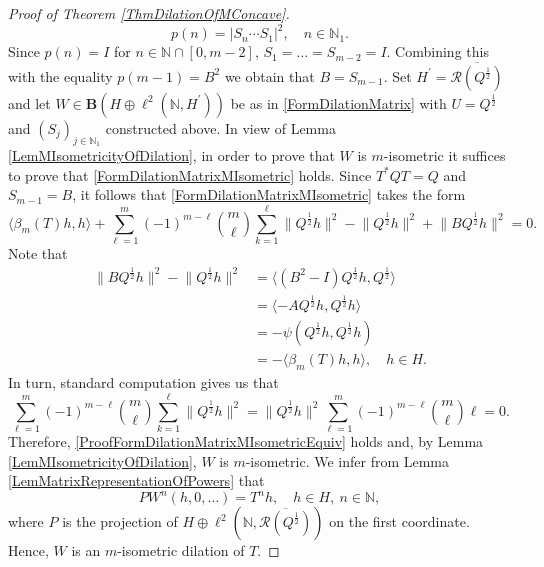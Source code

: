 \documentclass{amsart}
\theoremstyle{definition}
\numberwithin{equation}{section}
\begin{document}
\begin{proof}[Proof of Theorem \ref{ThmDilationOfMConcave}]
    \begin{equation}
        \label{ProofFormWeightOfUWSPolynomial}
        p(n) = \lvert S_{n}\cdots S_{1}\rvert^{2},\quad n\in \mathbb{N}_{1}.
    \end{equation}
    Since $ p(n)= I $ for $ n\in \mathbb{N}\cap[0,m-2] $, $ S_{1}= \ldots = S_{m-2} = I $. Combining this with the equality $ p(m-1) = B^{2} $ we obtain that $ B = S_{m-1} $. Set $ H^{\prime} = \overline{\mathcal{R}(Q^{\frac{1}{2}})} $ and let $ W\in \mathbf{B}(H\oplus \ell^{2}(\mathbb{N},H^{\prime})) $ be as in \eqref{FormDilationMatrix} with $ U = Q^{\frac{1}{2}} $ and $ (S_{j})_{j\in \mathbb{N}_{1}} $ constructed above. In view of Lemma \ref{LemMIsometricityOfDilation}, in order to prove that $ W $ is $ m $-isometric it suffices to prove that \eqref{FormDilationMatrixMIsometric} holds. Since $ T^{\ast}QT = Q $ and $ S_{m-1} = B $, it follows that \eqref{FormDilationMatrixMIsometric} takes the form
    \begin{equation}
        \label{ProofFormDilationMatrixMIsometricEquiv}
        \langle \beta_{m}(T)h,h\rangle+\sum_{\ell=1}^{m}(-1)^{m-\ell}\binom{m}{\ell}\sum_{k=1}^{\ell} \lVert Q^{\frac{1}{2}}h\rVert^{2} -\lVert Q^{\frac{1}{2}}h\rVert^{2}+\lVert BQ^{\frac{1}{2}}h\rVert^{2} = 0.
    \end{equation}
    Note that
    \begin{align*}
        \lVert BQ^{\frac{1}{2}}h\rVert^{2} - \lVert Q^{\frac{1}{2}}h\rVert^{2} &= \langle (B^{2}-I)Q^{\frac{1}{2}}h,Q^{\frac{1}{2}}\rangle\\
        &=\langle -AQ^{\frac{1}{2}}h,Q^{\frac{1}{2}}h\rangle\\
        &=-\psi(Q^{\frac{1}{2}}h,Q^{\frac{1}{2}}h)\\
        &=-\langle \beta_{m}(T)h,h\rangle, \quad h\in H.
    \end{align*}
    In turn, standard computation gives us that
    \begin{equation*}
        \sum_{\ell=1}^{m}(-1)^{m-\ell}\binom{m}{\ell}\sum_{k=1}^{\ell} \lVert Q^{\frac{1}{2}}h\rVert^{2} = \lVert Q^{\frac{1}{2}}h\rVert^{2}\sum_{\ell=1}^{m}(-1)^{m-\ell}\binom{m}{\ell}\ell = 0.
    \end{equation*}
    Therefore, \eqref{ProofFormDilationMatrixMIsometricEquiv} holds and, by Lemma \ref{LemMIsometricityOfDilation}, $ W $ is $ m $-isometric. We infer from Lemma \ref{LemMatrixRepresentationOfPowers} that
    \begin{equation*}
        P W^{n}(h,0,\ldots) = T^{n}h, \quad h\in H, \ n\in \mathbb{N},
    \end{equation*}
    where $ P $ is the projection of $ H\oplus \ell^{2}(\mathbb{N},\overline{\mathcal{R}(Q^{\frac{1}{2}})}) $ on the first coordinate. Hence, $ W $ is an $ m $-isometric dilation of $ T $.
\end{proof}
\end{document}
